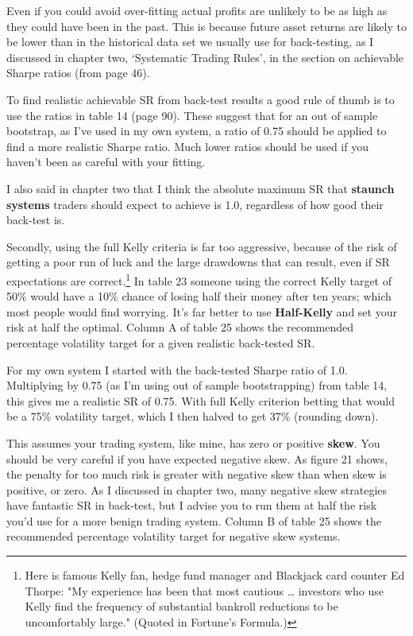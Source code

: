 Even if you could avoid over-fitting actual profits are unlikely to be as high as they could have been in the past. This is because future asset returns are likely to be lower than in the historical data set we usually use for back-testing, as I discussed in chapter two, ‘Systematic Trading Rules', in the section on achievable Sharpe ratios (from page 46).

To find realistic achievable SR from back-test results a good rule of thumb is to use the ratios in table 14 (page 90). These suggest that for an out of sample bootstrap, as I've used in my own system, a ratio of 0.75 should be applied to find a more realistic Sharpe ratio. Much lower ratios should be used if you haven't been as careful with your fitting.

I also said in chapter two that I think the absolute maximum SR that \textbf{staunch systems} traders should expect to achieve is 1.0, regardless of how good their back-test is.

Secondly, using the full Kelly criteria is far too aggressive, because of the risk of getting a poor run of luck and the large drawdowns that can result, even if SR expectations are correct.\footnote{Here is famous Kelly fan, hedge fund manager and Blackjack card counter Ed Thorpe: "My experience has been that most cautious … investors who use Kelly find the frequency of substantial bankroll reductions to be uncomfortably large." (Quoted in Fortune's Formula.)} In table 23 someone using the correct Kelly target of 50\% would have a 10\% chance of losing half their money after ten years; which most people would find worrying. It's far better to use \textbf{Half-Kelly} and set your risk at half the optimal. Column A of table 25 shows the recommended percentage volatility target for a given realistic back-tested SR.

For my own system I started with the back-tested Sharpe ratio of 1.0. Multiplying by 0.75 (as I'm using out of sample bootstrapping) from table 14, this gives me a realistic SR of 0.75. With full Kelly criterion betting that would be a 75\% volatility target, which I then halved to get 37\% (rounding down).

This assumes your trading system, like mine, has zero or positive \textbf{skew}. You should be very careful if you have expected negative skew. As figure 21 shows, the penalty for too much risk is greater with negative skew than when skew is positive, or zero. As I discussed in chapter two, many negative skew strategies have fantastic SR in back-test, but I advise you to run them at half the risk you'd use for a more benign trading system. Column B of table 25 shows the recommended percentage volatility target for negative skew systems.

